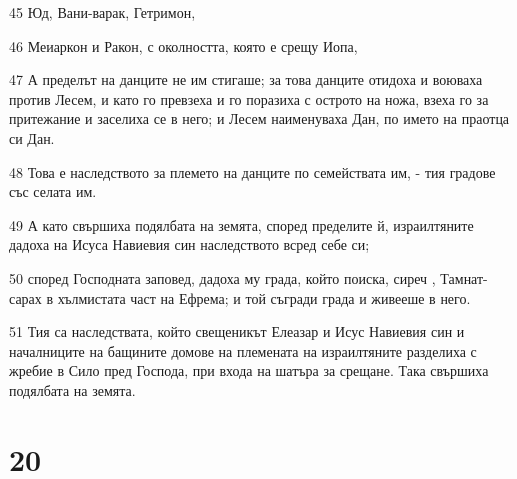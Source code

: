 \par 45 Юд, Вани-варак, Гетримон,
\par 46 Меиаркон и Ракон, с околността, която е срещу Иопа,
\par 47 А пределът на данците не им стигаше; за това данците отидоха и воюваха против Лесем, и като го превзеха и го поразиха с острото на ножа, взеха го за притежание и заселиха се в него; и Лесем наименуваха Дан, по името на праотца си Дан.
\par 48 Това е наследството за племето на данците по семействата им, - тия градове със селата им.
\par 49 А като свършиха подялбата на земята, според пределите й, израилтяните дадоха на Исуса Навиевия син наследството всред себе си;
\par 50 според Господната заповед, дадоха му града, който поиска, сиреч , Тамнат-сарах в хълмистата част на Ефрема; и той съгради града и живееше в него.
\par 51 Тия са наследствата, който свещеникът Елеазар и Исус Навиевия син и началниците на бащините домове на племената на израилтяните разделиха с жребие в Сило пред Господа, при входа на шатъра за срещане. Така свършиха подялбата на земята.

\chapter{20}

